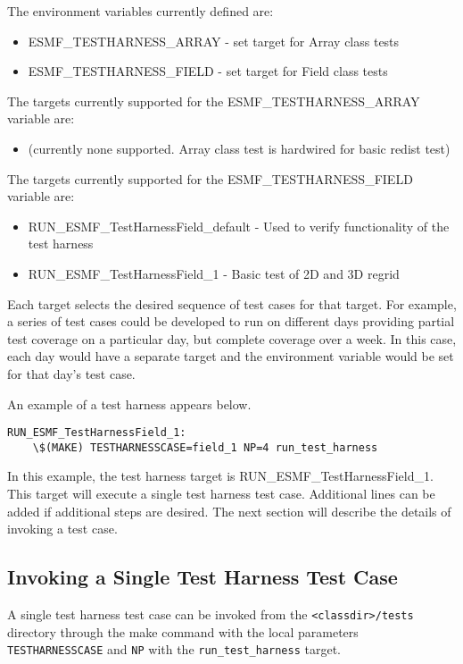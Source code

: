 The environment variables currently defined are:
\begin{itemize}
\item ESMF\_TESTHARNESS\_ARRAY - set target for Array class tests
\item ESMF\_TESTHARNESS\_FIELD - set target for Field class tests
\end{itemize}

The targets currently supported for the ESMF\_TESTHARNESS\_ARRAY variable are:
\begin{itemize}
\item (currently none supported.  Array class test is hardwired for basic redist test)
\end{itemize}

The targets currently supported for the ESMF\_TESTHARNESS\_FIELD variable are:
\begin{itemize}
\item RUN\_ESMF\_TestHarnessField\_default - Used to verify functionality of the test harness
\item RUN\_ESMF\_TestHarnessField\_1 - Basic test of 2D and 3D regrid
\end{itemize}

Each target selects the desired sequence of test cases for that target.
For example, a series of test cases could be developed to run on different days providing partial
test coverage on a particular day, but complete coverage over a week.
In this case, each day would have a separate target and the environment variable would be set for
that day's test case.

An example of a test harness appears below.
\begin{verbatim}
RUN_ESMF_TestHarnessField_1:
	\$(MAKE) TESTHARNESSCASE=field_1 NP=4 run_test_harness
\end{verbatim}

In this example, the test harness target is RUN\_ESMF\_TestHarnessField\_1.  This target will execute a
single test harness test case. Additional lines can be added if additional steps are desired.
The next section will describe the details of invoking a test case.

\subsection{Invoking a Single Test Harness Test Case}
A single test harness test case can be invoked from the \texttt{<classdir>/tests}
directory through the make command with the local parameters \texttt{TESTHARNESSCASE} and
\texttt{NP} with the \texttt{run\_test\_harness} target.

